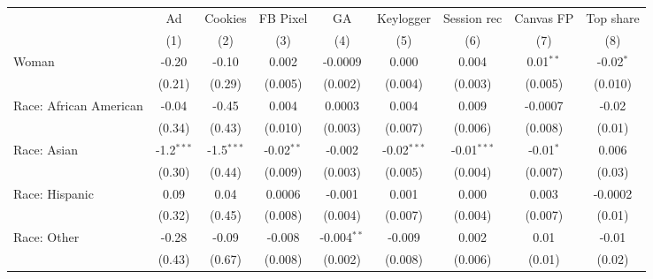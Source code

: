 
\begingroup
\centering
\begin{adjustbox}{width = \textwidth, center}
   \begin{tabular}{lcccccccc}
      \toprule
                              & Ad           & Cookies      & FB Pixel     & GA            & Keylogger             & Session rec           & Canvas FP    & Top share \\   
                              & (1)          & (2)          & (3)          & (4)           & (5)                   & (6)                   & (7)          & (8)\\  
      \midrule 
      Woman                   & -0.20        & -0.10        & 0.002        & -0.0009       & 0.000  & 0.004                 & 0.01$^{**}$  & -0.02$^{*}$\\   
                              & (0.21)       & (0.29)       & (0.005)      & (0.002)       & (0.004)               & (0.003)               & (0.005)      & (0.010)\\   
      Race: African American  & -0.04        & -0.45        & 0.004        & 0.0003        & 0.004                 & 0.009                 & -0.0007      & -0.02\\   
                              & (0.34)       & (0.43)       & (0.010)      & (0.003)       & (0.007)               & (0.006)               & (0.008)      & (0.01)\\   
      Race: Asian             & -1.2$^{***}$ & -1.5$^{***}$ & -0.02$^{**}$ & -0.002        & -0.02$^{***}$         & -0.01$^{***}$         & -0.01$^{*}$  & 0.006\\   
                              & (0.30)       & (0.44)       & (0.009)      & (0.003)       & (0.005)               & (0.004)               & (0.007)      & (0.03)\\   
      Race: Hispanic          & 0.09         & 0.04         & 0.0006       & -0.001        & 0.001                 & 0.000  & 0.003        & -0.0002\\   
                              & (0.32)       & (0.45)       & (0.008)      & (0.004)       & (0.007)               & (0.004)               & (0.007)      & (0.01)\\   
      Race: Other             & -0.28        & -0.09        & -0.008       & -0.004$^{**}$ & -0.009                & 0.002                 & 0.01         & -0.01\\   
                              & (0.43)       & (0.67)       & (0.008)      & (0.002)       & (0.008)               & (0.006)               & (0.01)       & (0.02)\\   

\end{tabular}
\end{adjustbox}
